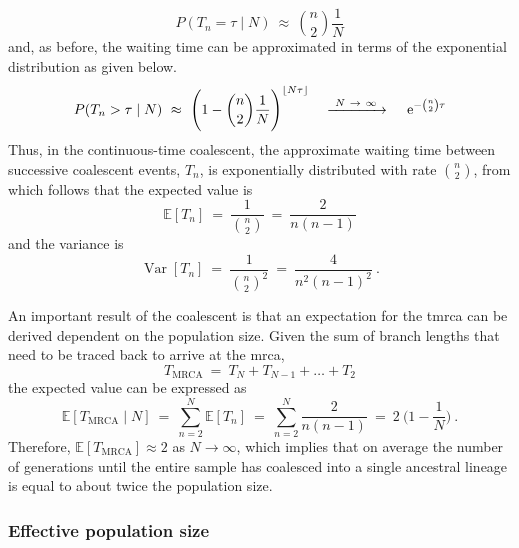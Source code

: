 \begin{equation}\label{eq:coal_approx}
	P(T_n = \tau \mid N) ~\approx~ {n \choose 2} \frac{1}{N}
\end{equation}
and, as before, the waiting time can be approximated in terms of the exponential distribution as given below.
\begin{equation}\label{eq:coal_n_approx}
	P(T_n > \tau \mid N)
	~\approx~ \Bigg( 1 - {n \choose 2} \frac{1}{N} \Bigg)^{\lfloor N \tau \rfloor}
	\quad \xrightarrow{~ N~\rightarrow~\infty ~} \quad
	\,\mathrm{e}^{-{n \choose 2}\tau}
\end{equation}
Thus, in the continuous-time coalescent, the approximate waiting time between successive coalescent events, $T_n$, is exponentially distributed with rate ${n \choose 2}$, from which follows that the expected value is
\begin{equation}\label{eq:coal_n_exp}
	\mathbb{E}[T_n] ~=~ \frac{1}{{n \choose 2}} ~=~ \frac{2}{n(n-1)}
\end{equation}
and the variance is
\begin{equation}\label{eq:coal_n_var}
	\operatorname{Var}[T_n] ~=~ \frac{1}{{n \choose 2}^2} ~=~ \frac{4}{n^2 (n-1)^2}
	\ .
\end{equation}

An important result of the coalescent is that an expectation for the \gls{tmrca} can be derived dependent on the population size.
Given the sum of branch lengths that need to be traced back to arrive at the \gls{mrca},
\begin{equation*}
	T_\text{MRCA} ~=~ T_N + T_{N-1} + \dots + T_2
\end{equation*}
the expected value can be expressed as
\begin{equation}\label{eq:coal_tmrca}
	\mathbb{E}[T_\text{MRCA} \mid N]
	~=~ \sum_{n = 2}^{N} \mathbb{E}[T_n]
	~=~ \sum_{n = 2}^{N} \frac{2}{n(n-1)}
	~=~ 2~\Big( 1 - \frac{1}{N} \Big)
	\ \text{.}
\end{equation}
Therefore, ${\mathbb{E}[T_\text{MRCA}] \approx 2}$ as ${N\rightarrow\infty}$, which implies that on average the number of generations until the entire sample has coalesced into a single ancestral lineage is equal to about twice the population size.


%
\subsubsection{Effective population size}
%

